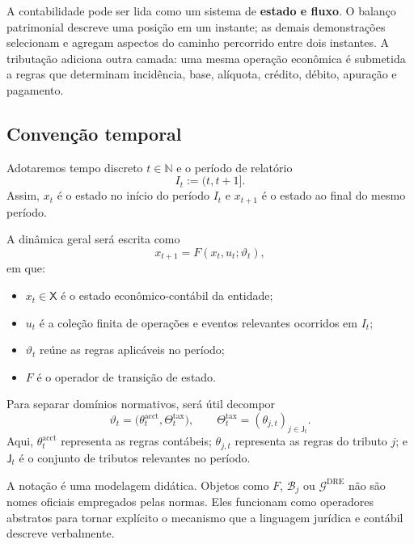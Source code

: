 \documentclass[11pt,a4paper]{article}
\newcommand{\N}{\mathbb{N}}
\newcommand{\DRE}{\mathrm{DRE}}
\newcommand{\cB}{\mathcal{B}}
\newcommand{\cG}{\mathcal{G}}
\newcommand{\periodo}[1]{I_{#1}:=(#1,#1+1]}
\begin{document}
\begin{intuicao}
A contabilidade pode ser lida como um sistema de \textbf{estado e fluxo}. O balanço patrimonial descreve uma posição em um instante; as demais demonstrações selecionam e agregam aspectos do caminho percorrido entre dois instantes. A tributação adiciona outra camada: uma mesma operação econômica é submetida a regras que determinam incidência, base, alíquota, crédito, débito, apuração e pagamento.
\end{intuicao}

\subsection{Convenção temporal}

Adotaremos tempo discreto $t\in\N$ e o período de relatório
\[
\periodo{t}.
\]
Assim, $x_t$ é o estado no início do período $I_t$ e $x_{t+1}$ é o estado ao final do mesmo período.

A dinâmica geral será escrita como
\begin{equation}
\boxed{x_{t+1}=F(x_t,u_t;\vartheta_t),}
\label{eq:dinamica-geral}
\end{equation}
em que:
\begin{itemize}
    \item $x_t\in\mathsf X$ é o estado econômico-contábil da entidade;
    \item $u_t$ é a coleção finita de operações e eventos relevantes ocorridos em $I_t$;
    \item $\vartheta_t$ reúne as regras aplicáveis no período;
    \item $F$ é o operador de transição de estado.
\end{itemize}

Para separar domínios normativos, será útil decompor
\begin{equation}
\boxed{\vartheta_t=\bigl(\theta_t^{\mathrm{acct}},\Theta_t^{\mathrm{tax}}\bigr),
\qquad
\Theta_t^{\mathrm{tax}}=(\theta_{j,t})_{j\in\mathsf J_t}.}
\label{eq:vartheta}
\end{equation}
Aqui, $\theta_t^{\mathrm{acct}}$ representa as regras contábeis; $\theta_{j,t}$ representa as regras do tributo $j$; e $\mathsf J_t$ é o conjunto de tributos relevantes no período.

\begin{cuidado}
A notação é uma modelagem didática. Objetos como $F$, $\cB_j$ ou $\cG^{\DRE}$ não são nomes oficiais empregados pelas normas. Eles funcionam como operadores abstratos para tornar explícito o mecanismo que a linguagem jurídica e contábil descreve verbalmente.
\end{cuidado}
\end{document}
